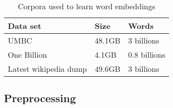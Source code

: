 \begin{table}[h]
\begin{center}
\begin{small}
\begin{tabular}{lll}
\hline
\textbf{Data set} & \textbf{Size} & \textbf{Words} \\ \hline
UMBC 	& 48.1GB & 3 billions \\
One Billion 	& 4.1GB & 0.8 billions  \\
Latest wikipedia dump & 49.6GB & 3 billions \\
\end{tabular}
\end{small}
\caption{Corpora used to learn word embeddings}
\label{wordEmbedCorpora}
\end{center}
\end{table}

\subsection{Preprocessing}

